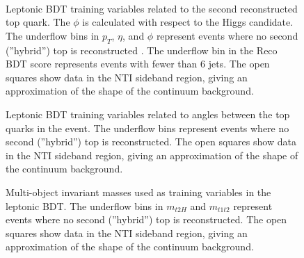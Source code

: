 \begin{figure}[htbp]
  \centering
	 \\
  \caption{Leptonic BDT training variables related to the second reconstructed top quark. The $\phi$ is calculated with respect to the Higgs candidate. The underflow bins in $p_{T}$, $\eta$, and $\phi$ represent events where no second (''hybrid'') top is reconstructed . The underflow bin in the Reco BDT score represents events with fewer than 6 jets. The open squares show data in the NTI sideband region, giving an approximation of the shape of the continuum background. }
  \label{fig:lepvbls3}
\end{figure}

\begin{figure}[htbp]
  \centering
  \caption{Leptonic BDT training variables related to angles between the top quarks in the event. The underflow bins represent events where no second (''hybrid'') top is reconstructed. The open squares show data in the NTI sideband region, giving an approximation of the shape of the continuum background. }
  \label{fig:lepvbls4}
\end{figure}

\begin{figure}[htbp]
  \centering
  \caption{Multi-object invariant masses used as training variables in the leptonic BDT. The underflow bins in $m_{t2H}$ and $m_{t1t2}$ represent events where no second (''hybrid'') top is reconstructed. The open squares show data in the NTI sideband region, giving an approximation of the shape of the continuum background. }
  \label{fig:lepvbls5}
\end{figure}

